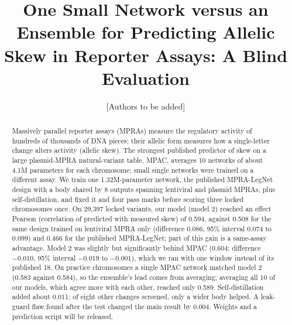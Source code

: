 \documentclass[11pt]{article}
\title{One Small Network versus an Ensemble for Predicting Allelic Skew in Reporter Assays: A Blind Evaluation}
\author{[Authors to be added]}
\date{}
\begin{document}
\maketitle

\begin{abstract}
Massively parallel reporter assays (MPRAs) measure the regulatory activity of hundreds of thousands of DNA pieces; their allelic form measures how a single-letter change alters activity (allelic skew). The strongest published predictor of skew on a large plasmid-MPRA natural-variant table, MPAC, averages 10 networks of about 4.1M parameters for each chromosome; small single networks were trained on a different assay. We train one 1.32M-parameter network, the published MPRA-LegNet design with a body shared by 8 outputs spanning lentiviral and plasmid MPRAs, plus self-distillation, and fixed it and four pass marks before scoring three locked chromosomes once. On 29,397 locked variants, our model (model 2) reached an effect Pearson (correlation of predicted with measured skew) of 0.594, against 0.508 for the same design trained on lentiviral MPRA only (difference 0.086, 95\% interval 0.074 to 0.099) and 0.466 for the published MPRA-LegNet; part of this gain is a same-assay advantage. Model 2 was slightly but significantly behind MPAC (0.604; difference $-0.010$, 95\% interval $-0.019$ to $-0.001$), which we ran with one window instead of its published 18. On practice chromosomes a single MPAC network matched model 2 (0.583 against 0.584), so the ensemble's lead comes from averaging; averaging all 10 of our models, which agree more with each other, reached only 0.589. Self-distillation added about 0.011; of eight other changes screened, only a wider body helped. A leak-guard flaw found after the test changed the main result by 0.004. Weights and a prediction script will be released.
\end{abstract}
\end{document}
